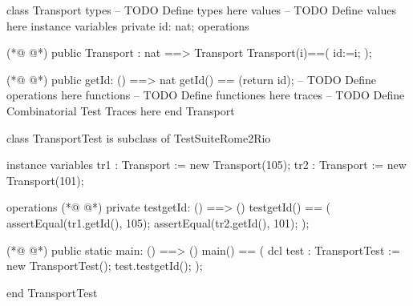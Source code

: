 \begin{vdmpp}[breaklines=true]
class Transport
types
-- TODO Define types here
values
-- TODO Define values here
instance variables
private id: nat;
operations

(*@
\label{Transport:10}
@*)
public Transport : nat ==> Transport
 Transport(i)==(
 id:=i;
 );
 
(*@
\label{getId:15}
@*)
public getId: () ==> nat
  getId() == (return id);
-- TODO Define operations here
functions
-- TODO Define functiones here
traces
-- TODO Define Combinatorial Test Traces here
end Transport

class TransportTest is subclass of TestSuiteRome2Rio

 instance variables
 tr1 : Transport := new Transport(105);
 tr2 : Transport := new Transport(101);
 
 
 operations
(*@
\label{testgetId:32}
@*)
  private testgetId: () ==> ()
   testgetId() == (
    assertEqual(tr1.getId(), 105);
    assertEqual(tr2.getId(), 101);
   );
   
   
(*@
\label{main:39}
@*)
 public static main: () ==> ()
      main() ==
      (
       dcl test : TransportTest := new TransportTest();
       test.testgetId();
       );
       
end TransportTest
\end{vdmpp}

